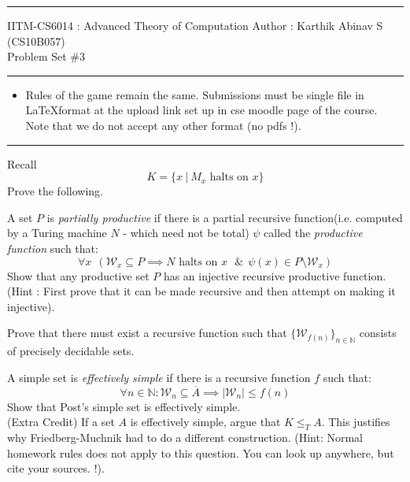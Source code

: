 \documentclass[addpoints,12pt]{exam}
\renewcommand{\W}{\mathcal{W}}
\begin{document}
\hrule
\vspace{3mm}
\noindent
{\sf IITM-CS6014 : Advanced Theory of Computation  \hfill Author : Karthik Abinav S (CS10B057)}
\vspace{3mm}\\
\noindent
{\sf Problem Set \#3 }
\vspace{3mm}
\hrule
{\small
\begin{itemize}
\item Rules of the game remain the same. Submissions must be single file in \LaTeX format at the upload link set up in cse moodle page of the course. Note that we do not accept any other format (no pdfs !).
\end{itemize}}
\hrule

\begin{questions}
\question[10]
Recall
\[ K = \{ x~|~M_x \text{ halts on } x\}\] Prove the following.

\question[10] A set $P$ is \textit{partially productive} if there is a partial recursive function(i.e. computed by a Turing machine $N$ - which need not be total) $\psi$ called the {\em productive function} such that:
\[ \forall x ~~\left( \mathcal{W}_x \subseteq P \implies N \textrm{ halts on $x$ } 
\&~~\psi(x) \in P \setminus \mathcal{W}_x \right) \]
Show that any productive set $P$ has an injective recursive productive function. \\ (Hint : First prove that it can be made recursive and then attempt on making it injective).

\question[5]
Prove that there must exist a recursive function such that $\{ \W_{f(n)} \}_{n \in \mathbb{N}}$ consists of precisely decidable sets.

\question[5]
A simple set is {\em effectively simple} if there is a recursive function $f$ such that:
\[ \forall n\in \mathbb{N} : \W_n \subseteq \overline{A} \implies |\W_n| \le f(n) \]
Show that Post's simple set is effectively simple. \\[2mm]
(Extra Credit) If a set $A$ is effectively simple, argue that $K \le_T A$. This justifies why Friedberg-Muchnik had to do a different construction. 
(Hint: Normal homework rules does not apply to this question. You can look up anywhere, but cite your sources. !).


\end{questions}
\end{document}
